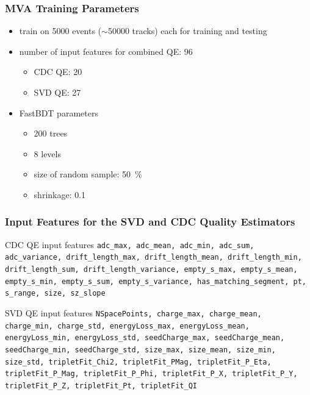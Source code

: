 \documentclass[18pt, aspectratio=169]{beamer}
\begin{document}
\begin{frame}
  \frametitle{MVA Training Parameters}
  \begin{itemize}
  \item train on \num{5000} events ($\sim$\num{50 000} tracks) each for training and testing
  \item number of input features for combined QE: 96
    \begin{itemize}
    \item CDC QE: 20
    \item SVD QE: 27
    \end{itemize}
  \item FastBDT parameters
  \begin{itemize}
    \item 200 trees
    \item 8 levels
    \item size of random sample: \SI{50}{\percent}
    \item shrinkage: \num{0.1}
    \end{itemize}
  \end{itemize}
\end{frame}

\begin{frame}
  \frametitle{Input Features for the SVD and CDC Quality Estimators}
  \begin{block}{CDC QE input features}
    \texttt{\scriptsize adc\_max, adc\_mean, adc\_min, adc\_sum, adc\_variance, drift\_length\_max,
      drift\_length\_mean, drift\_length\_min, drift\_length\_sum, drift\_length\_variance, empty\_s\_max,
      empty\_s\_mean, empty\_s\_min, empty\_s\_sum, empty\_s\_variance, has\_matching\_segment, pt, s\_range,
      size, sz\_slope}
  \end{block}
  \begin{block}{SVD QE input features}
    \texttt{\scriptsize NSpacePoints, charge\_max, charge\_mean, charge\_min, charge\_std,
      energyLoss\_max, energyLoss\_mean, energyLoss\_min, energyLoss\_std, seedCharge\_max,
      seedCharge\_mean, seedCharge\_min, seedCharge\_std, size\_max, size\_mean, size\_min, size\_std,
      tripletFit\_Chi2, tripletFit\_PMag, tripletFit\_P\_Eta, tripletFit\_P\_Mag, tripletFit\_P\_Phi,
      tripletFit\_P\_X, tripletFit\_P\_Y, tripletFit\_P\_Z, tripletFit\_Pt, tripletFit\_QI}
  \end{block}

\end{frame}
\end{document}
